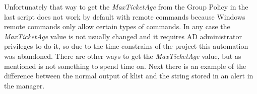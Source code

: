 \linej


\linej
Unfortunately that way to get the \textit{MaxTicketAge} from the Group Policy in the last script does not work by default with remote commands because Windows remote commands only allow certain types of commands.
In any case the \textit{MaxTicketAge} value is not usually changed and it requires AD administrator privileges to do it, so due to the time constrains of the project this automation was abandoned. There are other ways to get the \textit{MaxTicketAge} value, but as mentioned is not something to spend time on.
\linej
\linej
Next there is an example of the difference between the normal output of klist and the string stored in an alert in the manager.

